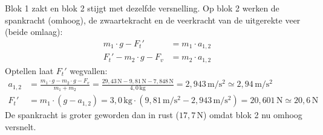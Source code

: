 \documentclass{ximera}
\begin{document}
\begin{exercise}
\begin{question}
\begin{solution}
            Blok 1 zakt en blok 2 stijgt met dezelfde versnelling. Op blok 2 werken de spankracht (omhoog), de zwaartekracht en de veerkracht van de uitgerekte veer (beide omlaag):
            \begin{align*}
                m_{1} \cdot g - F_{t}' &= m_{1} \cdot a_{1,2} \\
                F_{t}' - m_{2} \cdot g - F_{v} &= m_{2} \cdot a_{1,2}
            \end{align*}
            Optellen laat $F_{t}'$ wegvallen:
            \begin{align*}
                a_{1,2} &= \frac{m_{1} \cdot g - m_{2} \cdot g - F_{v}}{m_{1}+m_{2}} = \frac{29{,}43 \, \mathrm{N} - 9{,}81 \, \mathrm{N} - 7{,}848 \, \mathrm{N}}{4{,}0 \, \mathrm{kg}} = 2{,}943 \, \mathrm{m/s^2} \simeq 2{,}94 \, \mathrm{m/s^2} \\
                F_{t}' &= m_{1} \cdot (g - a_{1,2}) = 3{,}0 \, \mathrm{kg} \cdot (9{,}81 \, \mathrm{m/s^2} - 2{,}943 \, \mathrm{m/s^2}) = 20{,}601 \, \mathrm{N} \simeq 20{,}6 \, \mathrm{N}
            \end{align*}
            De spankracht is groter geworden dan in rust ($17{,}7 \, \mathrm{N}$) omdat blok 2 nu omhoog versnelt.
        \end{solution}
    \end{question}
\end{exercise}
\end{document}
